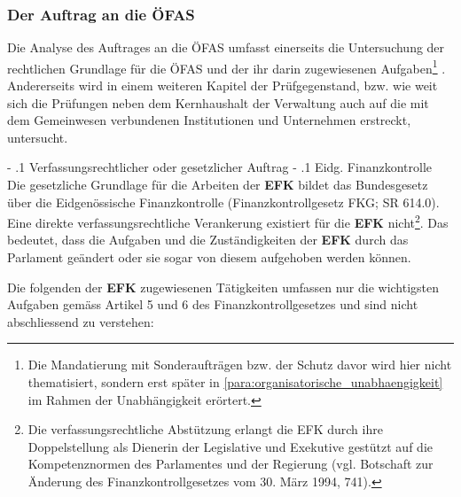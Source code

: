 \documentclass[10pt]{article}
\makeatletter
\renewcommand\paragraph{\@startsection{paragraph}{3}{0mm}{-\baselineskip}{.1\baselineskip}{\normalfont\normalsize\bfseries}}
\renewcommand\subparagraph{\@startsection{subparagraph}{4}{0mm}{-\baselineskip}{.1\baselineskip}{\normalfont\normalsize\bfseries}}
\renewcommand\paragraph{%
\@startsection{paragraph}{3}{0mm}%
{-\baselineskip}%
{.1\baselineskip}%
{\normalfont\normalsize\bfseries}}
\renewcommand\subparagraph{%
\@startsection{subparagraph}{4}{0mm}%
{-\baselineskip}%
{.1\baselineskip}%
{\normalfont\normalsize\bfseries}}
\makeatother
\begin{document}
\subsubsection{Der Auftrag an die ÖFAS}\label{subsubsec:der_auftrag_an_die_ofas}
Die Analyse des Auftrages an die ÖFAS umfasst einerseits die Untersuchung der rechtlichen Grundlage für die ÖFAS und der ihr darin zugewiesenen Aufgaben\footnote{Die Mandatierung mit Sonderaufträgen bzw. der Schutz davor wird hier nicht thematisiert, sondern erst später in \vref{para:organisatorische_unabhaengigkeit} im Rahmen der Unabhängigkeit erörtert.} . Andererseits wird in einem weiteren Kapitel der Prüfgegenstand, bzw. wie weit sich die Prüfungen neben dem Kernhaushalt der Verwaltung auch auf die mit dem Gemeinwesen verbundenen Institutionen und Unternehmen erstreckt, untersucht.

\paragraph{Verfassungsrechtlicher oder gesetzlicher Auftrag}\label{para:verfassungsrechtlicher_oder_gesetzlicher_auftrag}
\subparagraph{Eidg. Finanzkontrolle}\label{subpara:eidg__finanzkontrolle}
Die gesetzliche Grundlage für die Arbeiten der \textbf{EFK} bildet das Bundesgesetz über die Eidgenössische Finanzkontrolle (Finanzkontrollgesetz FKG; SR 614.0). Eine direkte verfassungs­rechtliche Verankerung existiert für die \textbf{EFK} nicht\footnote{Die verfassungsrechtliche Abstützung erlangt die EFK durch ihre Doppelstellung als Dienerin der Legislative und Exekutive gestützt auf die Kompetenznormen des Parlamentes und der Regierung (vgl. Botschaft zur Änderung des Finanzkontrollgesetzes vom 30. März 1994, 741).}. Das bedeutet, dass die Aufgaben und die Zuständigkeiten der \textbf{EFK} durch das Parlament geändert oder sie sogar von diesem aufgehoben werden können.

Die folgenden der \textbf{EFK} zugewiesenen Tätigkeiten umfassen nur die wichtigsten Aufgaben gemäss Artikel 5 und 6 des Finanzkontrollgesetzes und sind nicht abschliessend zu verstehen: 
\end{document}
